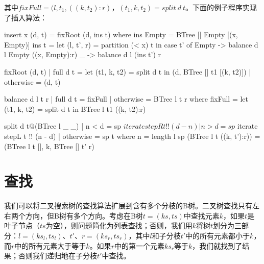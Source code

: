 \documentclass[b5paper]{ctexart}
\begin{document}
其中$fixFull = (l, t_1, ((k, t_2):r)$，$(t_1, k, t_2) = split\ d\ t$。下面的例子程序实现了插入算法：

\begin{Haskell}
insert x (d, t) = fixRoot (d, ins t) where
  ins Empty = BTree [] Empty [(x, Empty)]
  ins t = let (l, t', r) = partition (< x) t in
    case t' of
      Empty -> balance d l Empty ((x, Empty):r)
      _     -> balance d l (ins t') r

fixRoot (d, t) | full d t = let (t1, k, t2) = split d t in
                   (d, BTree [] t1 [(k, t2)])
               | otherwise = (d, t)

balance d l t r | full d t = fixFull
                | otherwise = BTree l t r
  where
    fixFull = let (t1, k, t2) = split d t in BTree l t1 ((k, t2):r)

split d t@(BTree l _ _) | n < d = sp $ iterate stepR t !! (d - n)
                        | n > d = sp $ iterate stepL t !! (n - d)
                        | otherwise = sp t
  where
    n = length l
    sp (BTree l t ((k, t'):r)) = (BTree l t [], k, BTree [] t' r)
\end{Haskell}

\begin{Exercise}\label{ex:btree-insert}
\label{ex:btree-leq}
\label{ex:btree-loop-insert}
\label{ex:btree-binary-search}
\end{Exercise}

\begin{Answer}[ref = {ex:btree-insert}]


\end{Answer}

\section{查找}

我们可以将二叉搜索树的查找算法扩展到含有多个分枝的B树。二叉树查找只有左右两个方向，但B树有多个方向。考虑在B树$t = (ks, ts)$中查找元素$k$，如果$t$是叶子节点（$ts$为空），则问题简化为列表查找；否则，我们用$k$将树$t$划分为三部分：$l = (ks_l, ts_l)$、$t'$、$r = (ks_r, ts_r)$，其中$l$和子分枝$t'$中的所有元素都小于$k$，而$r$中的所有元素大于等于$k$。如果$r$中的第一个元素$ks_r$等于$k$，我们就找到了结果；否则我们递归地在子分枝$t'$中查找。
\end{document}
